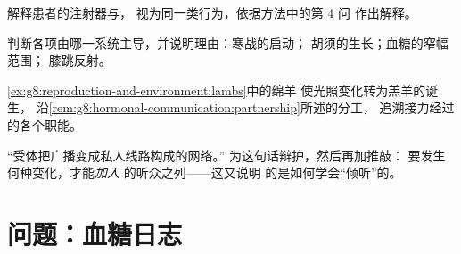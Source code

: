 \begin{exercise}[$\star\star$]\label{exo:g8:hormonal-communication:9}
解释患者的注射器与，
视为同一类行为，依据方法中的第 4 问
作出解释。
\end{exercise}

\begin{exercise}[$\star\star$]\label{exo:g8:hormonal-communication:10}
判断各项由哪一系统主导，并说明理由：寒战的启动；
胡须的生长；血糖的窄幅范围；
膝跳反射。
\end{exercise}

\begin{exercise}[$\star\star$]\label{exo:g8:hormonal-communication:11}
\cref{ex:g8:reproduction-and-environment:lambs}中的绵羊
使光照变化转为羔羊的诞生，
沿\cref{rem:g8:hormonal-communication:partnership}所述的分工，
追溯接力经过的各个职能。
\end{exercise}

\begin{exercise}[$\star\star\star$]\label{exo:g8:hormonal-communication:12}
“受体把广播变成私人线路构成的网络。”
为这句话辩护，然后再加推敲：
要发生何种变化，才能\emph{加入}
的听众之列——这又说明
的是如何学会“倾听”的。
\end{exercise}

\section{问题：血糖日志}

